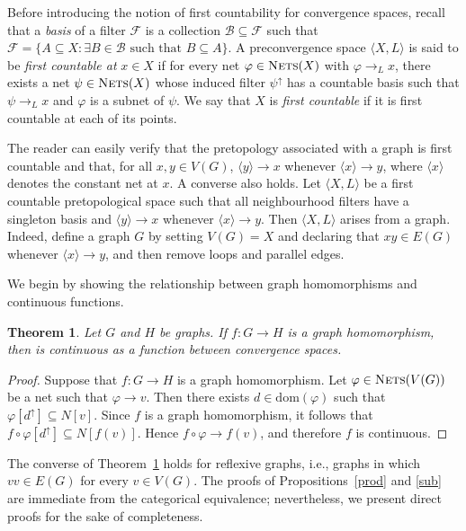 \documentclass{amsart}
\newtheorem{theorem}{Theorem}[section]
\theoremstyle{definition}
\theoremstyle{remark}
\numberwithin{equation}{section}
\begin{document}
Before introducing the notion of first countability for convergence spaces, recall that a \emph{basis} of a filter $\mathcal{F}$ is a collection $\mathcal{B}\subseteq \mathcal{F}$ such that
$
\mathcal{F}
=
\{A\subseteq X : \exists B\in\mathcal{B}\text{ such that } B\subseteq A\}
$.
A preconvergence space $\langle X, L\rangle$ is said to be 
\emph{first countable at} $x \in X$ if for every net 
$\varphi \in \textsc{Nets}(X)$ with $\varphi \to_{L} x$, 
there exists a net $\psi \in \textsc{Nets}(X)$ whose induced filter $\psi^\uparrow$ has a countable basis such that 
$\psi \to_{L} x$ and $\varphi$ is a subnet of $\psi$. 
We say that $X$ is \emph{first countable} if it is first countable at each of its points.

The reader can easily verify that the pretopology associated with a graph is first countable and that, for all $x,y\in V(G)$, $\langle y\rangle \to x$ whenever $\langle x\rangle \to y$, where $\langle x\rangle$ denotes the constant net at $x$.
A converse also holds. Let $\langle X,L\rangle$ be a first countable pretopological space such that all neighbourhood filters have a singleton basis and $\langle y\rangle \to x$ whenever $\langle x\rangle \to y$. 
Then $\langle X,L\rangle$ arises from a graph. Indeed, define a graph $G$ by setting $V(G)=X$ and declaring that $xy\in E(G)$ whenever $\langle x\rangle \to y$, and then remove loops and parallel edges.

We begin by showing the relationship between graph homomorphisms and continuous functions.


\begin{theorem}
	\label{cat} Let $G$ and $H$ be graphs.  If $f: G\to H$ is a graph homomorphism, then is continuous as a function between convergence spaces.
	

\end{theorem}

\begin{proof}
Suppose that $f:G\to H$ is a graph homomorphism. Let $\varphi\in\textsc{Nets}(V(G))$ be a net such that $\varphi\to v$. Then there exists $d\in\mathrm{dom}(\varphi)$ such that $\varphi[d^\uparrow]\subseteq N[v]$. Since $f$ is a graph homomorphism, it follows that $f\circ\varphi[d^\uparrow]\subseteq N[f(v)]$. Hence $f\circ\varphi\to f(v)$, and therefore $f$ is continuous.
\end{proof}


The converse of Theorem~\ref{cat} holds for reflexive graphs, i.e., graphs in which $vv\in E(G)$ for every $v\in V(G)$. The proofs of Propositions~\ref{prod} and \ref{sub} are immediate from the categorical equivalence; nevertheless, we present direct proofs for the sake of completeness.
\end{document}
